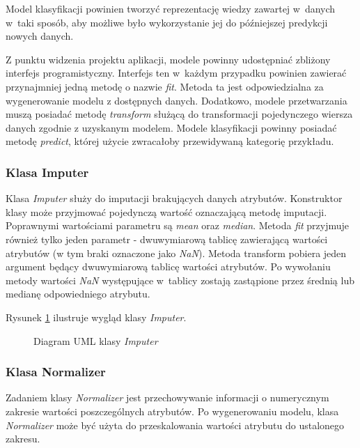 \documentclass[../thesis.tex]{subfiles}
\begin{document}
Model klasyfikacji powinien tworzyć reprezentację wiedzy zawartej w~danych w~taki sposób, aby możliwe było wykorzystanie jej do późniejszej predykcji nowych danych.

Z punktu widzenia projektu aplikacji, modele powinny udostępniać zbliżony interfejs programistyczny. Interfejs ten w~każdym przypadku powinien zawierać przynajmniej jedną metodę o nazwie \emph{fit}. Metoda ta jest odpowiedzialna za wygenerowanie modelu z dostępnych danych. Dodatkowo, modele przetwarzania muszą posiadać metodę \emph{transform} służącą do transformacji pojedynczego wiersza danych zgodnie z uzyskanym modelem. Modele klasyfikacji powinny posiadać metodę \emph{predict}, której użycie zwracałoby przewidywaną kategorię przykładu.

\subsubsection{Klasa Imputer}

Klasa \emph{Imputer} służy do imputacji brakujących danych atrybutów. Konstruktor klasy może przyjmować pojedynczą wartość oznaczającą metodę imputacji. Poprawnymi wartościami parametru są \emph{mean} oraz \emph{median}. Metoda \emph{fit} przyjmuje również tylko jeden parametr - dwuwymiarową tablicę zawierającą wartości atrybutów (w tym braki oznaczone jako \emph{NaN}). Metoda transform pobiera jeden argument będący dwuwymiarową tablicę wartości atrybutów. Po wywołaniu metody wartości \emph{NaN} występujące w~tablicy zostają zastąpione przez średnią lub medianę odpowiedniego atrybutu. 

Rysunek \ref{proj:diagram_imputer} ilustruje wygląd klasy \emph{Imputer}.

\begin{figure}[h]
\centering
{}
\caption{Diagram UML klasy \emph{Imputer}}
\label{proj:diagram_imputer}
\end{figure}

\subsubsection{Klasa Normalizer}

Zadaniem klasy \emph{Normalizer} jest przechowywanie informacji o numerycznym zakresie wartości poszczególnych atrybutów. Po wygenerowaniu modelu, klasa \emph{Normalizer} może być użyta do przeskalowania wartości atrybutu do ustalonego zakresu. 
\end{document}
